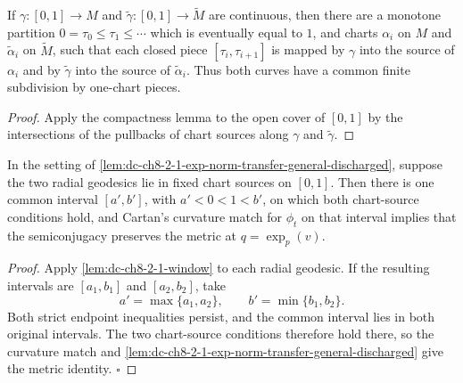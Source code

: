 \begin{lemma}
  \label{lem:dc-ch8-2-1-chart-partition}


  If $\gamma:[0,1]\to M$ and $\tilde\gamma:[0,1]\to\tilde M$ are continuous, then there are
  a monotone partition $0=\tau_0\leq\tau_1\leq\cdots$ which is eventually equal to $1$, and
  charts $\alpha_i$ on $M$ and $\tilde\alpha_i$ on $\tilde M$, such that each closed piece
  $[\tau_i,\tau_{i+1}]$ is mapped by $\gamma$ into the source of $\alpha_i$ and by
  $\tilde\gamma$ into the source of $\tilde\alpha_i$.  Thus both curves have a common finite
  subdivision by one-chart pieces.
\end{lemma}
\begin{proof}

  Apply the compactness lemma to the open cover of $[0,1]$ by the intersections of the pullbacks
  of chart sources along $\gamma$ and $\tilde\gamma$.
\end{proof}

\begin{lemma}
  \label{lem:dc-ch8-2-1-window-transfer}


  In the setting of \cref{lem:dc-ch8-2-1-exp-norm-transfer-general-discharged}, suppose the two
  radial geodesics lie in fixed chart sources on $[0,1]$. Then there is one common interval
  $[a',b']$, with $a'<0<1<b'$, on which both chart-source conditions hold, and Cartan's
  curvature match for $\phi_t$ on that interval implies that the semiconjugacy preserves the
  metric at $q=\exp_p(v)$.
\end{lemma}
\begin{proof}

  Apply \cref{lem:dc-ch8-2-1-window} to each radial geodesic. If the resulting intervals are
  $[a_1,b_1]$ and $[a_2,b_2]$, take
  $$
  a'=\max\{a_1,a_2\},\qquad b'=\min\{b_1,b_2\}.
  $$
  Both strict endpoint inequalities persist, and the common interval lies in both original
  intervals. The two chart-source conditions therefore hold there, so the curvature match and
  \cref{lem:dc-ch8-2-1-exp-norm-transfer-general-discharged} give the metric identity. $\square$
\end{proof}


